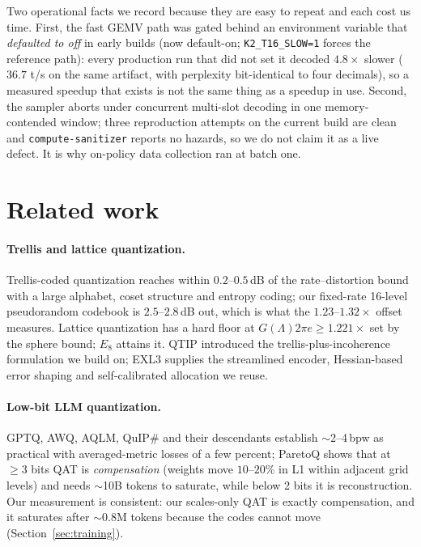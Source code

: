 \documentclass[11pt,a4paper]{article}
\begin{document}
Two operational facts we record because they are easy to repeat and each cost us time. First, the
fast GEMV path was gated behind an environment variable that \emph{defaulted to off} in early builds
(now default-on; \texttt{K2\_T16\_SLOW=1} forces the reference path):
every production run that did not set it decoded $4.8\times$ slower ($36.7$ t/s on the same
artifact, with perplexity bit-identical to four decimals), so a measured speedup that exists is not
the same thing as a speedup in use. Second, the sampler aborts under concurrent multi-slot
decoding in one memory-contended window; three reproduction attempts on the current build are clean and
\texttt{compute-sanitizer} reports no hazards, so we do not claim it as a live defect. It is why on-policy
data collection ran at
batch one.

\section{Related work}

\paragraph{Trellis and lattice quantization.} Trellis-coded quantization reaches within
$0.2$--$0.5$\,dB of the rate--distortion bound with a large alphabet, coset structure and entropy
coding; our fixed-rate 16-level pseudorandom codebook is $2.5$--$2.8$\,dB out, which is what the
$1.23$--$1.32\times$ offset measures. Lattice quantization has a hard floor at
$G(\Lambda)2\pi e\ge1.221\times$ set by the sphere bound; $E_8$ attains it. QTIP introduced the
trellis-plus-incoherence formulation we build on; EXL3 supplies the streamlined encoder,
Hessian-based error shaping and self-calibrated allocation we reuse.

\paragraph{Low-bit LLM quantization.} GPTQ, AWQ, AQLM, QuIP\# and their descendants establish
$\sim$2--4\,bpw as practical with averaged-metric losses of a few percent; ParetoQ shows that at
$\ge3$ bits QAT is \emph{compensation} (weights move $10$--$20\%$ in L1 within adjacent grid
levels) and needs $\sim$10B tokens to saturate, while below 2 bits it is reconstruction. Our
measurement is consistent: our scales-only QAT is exactly compensation, and it saturates after
$\sim$0.8M tokens because the codes cannot move (Section~\ref{sec:training}).
\end{document}
